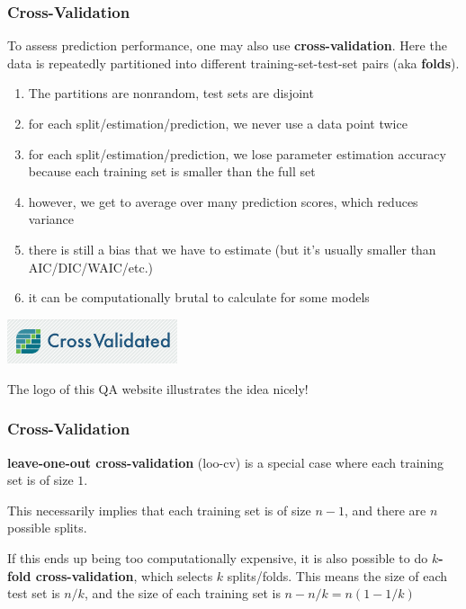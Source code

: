\documentclass{beamer}
\begin{document}
\begin{frame}
\frametitle{Cross-Validation}

To assess prediction performance, one may also use {\bf cross-validation}. Here the data is repeatedly partitioned into different training-set-test-set pairs (aka {\bf folds}).

\begin{enumerate}
\item The partitions are nonrandom, test sets are disjoint
\item for each split/estimation/prediction, we never use a data point twice
\item for each split/estimation/prediction, we lose parameter estimation accuracy because each training set is smaller than the full set
\item however, we get to average over many prediction scores, which reduces variance
\item there is still a bias that we have to estimate (but it's usually smaller than AIC/DIC/WAIC/etc.)
\item it can be computationally brutal to calculate for some models
\end{enumerate}
\pause

\includegraphics[width=50mm,right]{cv_logo.png}

The logo of this QA website illustrates the idea nicely!
\newline

\end{frame}

\begin{frame}
\frametitle{Cross-Validation}


{\bf leave-one-out cross-validation} (loo-cv) is a special case where each training set is of size $1$.
\newline

This necessarily implies that each training set is of size $n-1$, and there are $n$ possible splits.
\newline

If this ends up being too computationally expensive, it is also possible to do {\bf $k$-fold cross-validation}, which selects $k$ splits/folds. This means the size of each test set is $n/k$, and the size of each training set is $n -n/k = n(1 - 1/k)$

\end{frame}
\end{document}
